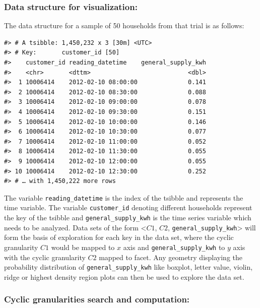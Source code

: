 \documentclass[12pt]{article}
\begin{document}
\hypertarget{data-structure-for-visualization}{%
\subsubsection{Data structure for visualization:}\label{data-structure-for-visualization}}

The data structure for a sample of 50 households from that trial is as follows:

\begin{verbatim}
#> # A tsibble: 1,450,232 x 3 [30m] <UTC>
#> # Key:       customer_id [50]
#>    customer_id reading_datetime    general_supply_kwh
#>    <chr>       <dttm>                           <dbl>
#>  1 10006414    2012-02-10 08:00:00              0.141
#>  2 10006414    2012-02-10 08:30:00              0.088
#>  3 10006414    2012-02-10 09:00:00              0.078
#>  4 10006414    2012-02-10 09:30:00              0.151
#>  5 10006414    2012-02-10 10:00:00              0.146
#>  6 10006414    2012-02-10 10:30:00              0.077
#>  7 10006414    2012-02-10 11:00:00              0.052
#>  8 10006414    2012-02-10 11:30:00              0.055
#>  9 10006414    2012-02-10 12:00:00              0.055
#> 10 10006414    2012-02-10 12:30:00              0.252
#> # … with 1,450,222 more rows
\end{verbatim}

The variable \texttt{reading\_datetime} is the index of the tsibble and represents the time variable. The variable \texttt{customer\_id} denoting different households represent the key of the tsibble and \texttt{general\_supply\_kwh} is the time series variable which needs to be analyzed. Data sets of the form \textless{}\(C1\), \(C2\), \texttt{general\_supply\_kwh}\textgreater{} will form the basis of exploration for each key in the data set, where the cyclic granularity \(C1\) would be mapped to \(x\) axis and \texttt{general\_supply\_kwh} to \(y\) axis with the cyclic granularity \(C2\) mapped to facet. Any geometry displaying the probability distribution of \texttt{general\_supply\_kwh} like boxplot, letter value, violin,
ridge or highest density region plots can then be used to explore the data set.

\hypertarget{cyclic-granularities-search-and-computation}{%
\subsubsection{Cyclic granularities search and computation:}\label{cyclic-granularities-search-and-computation}}
\end{document}
